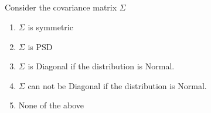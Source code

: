 \begin{frame}
\section{}
Consider the covariance matrix $\Sigma$

\begin{enumerate}
\item $\Sigma$ is symmetric   %
\item $\Sigma$ is PSD   %
\item $\Sigma$ is Diagonal if the distribution is Normal.
\item $\Sigma$ can not be Diagonal if the distribution is Normal.
\item None of the above     %
\end{enumerate}
\end{frame}
